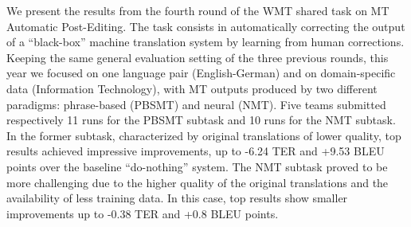 We present the results from the fourth round of the WMT shared task on MT Automatic Post-Editing. The task consists in automatically correcting the output of a ``black-box'' machine translation system by learning from human corrections. Keeping the same general evaluation setting of the three previous rounds, this year we focused on one language pair (English-German) and on domain-specific data (Information Technology), with MT outputs produced by two different paradigms: phrase-based (PBSMT) and neural (NMT). Five teams submitted respectively 11 runs for the PBSMT subtask and 10 runs for the NMT subtask. In the former subtask, characterized by original translations of lower quality, top results achieved impressive improvements, up to -6.24 TER and +9.53 BLEU points over the baseline ``do-nothing'' system. The NMT subtask proved to be more challenging due to the higher quality of the original translations and the availability of less training data. In this case, top results show smaller improvements up to -0.38 TER and +0.8 BLEU points.
